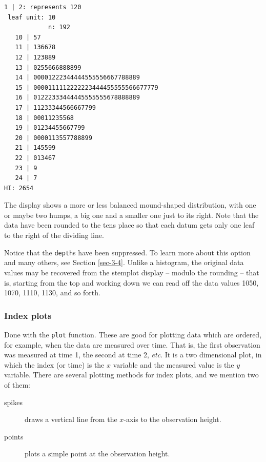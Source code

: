 \documentclass[captions=tableheading]{scrbook}
\begin{document}
\begin{verbatim}
1 | 2: represents 120
 leaf unit: 10
            n: 192
   10 | 57
   11 | 136678
   12 | 123889
   13 | 0255666888899
   14 | 00001222344444555556667788889
   15 | 0000111112222223444455555566677779
   16 | 01222333444445555555678888889
   17 | 11233344566667799
   18 | 00011235568
   19 | 01234455667799
   20 | 0000113557788899
   21 | 145599
   22 | 013467
   23 | 9
   24 | 7
HI: 2654
\end{verbatim}

The display shows a more or less balanced mound-shaped distribution, with one or maybe two humps, a big one and a smaller one just to its right. Note that the data have been rounded to the tens place so that each datum gets only one leaf to the right of the dividing line.

Notice that the \texttt{depth}s have been suppressed. To learn more about this option and many others, see Section \ref{sec-3-4}. Unlike a histogram, the original data values may be recovered from the stemplot display -- modulo the rounding -- that is, starting from the top and working down we can read off the data values 1050, 1070, 1110, 1130, and so forth. 
\subsubsection{Index plots}
\label{sec-3-1-2-4}


Done with the \texttt{plot} function. These are good for plotting data which are ordered, for example, when the data are measured over time. That is, the first observation was measured at time 1, the second at time 2, \emph{etc}. It is a two dimensional plot, in which the index (or time) is the \(x\) variable and the measured value is the \(y\) variable. There are several plotting methods for index plots, and we mention two of them:

\begin{description}
\item[spikes] draws a vertical line from the \(x\)-axis to the observation height.
\item[points] plots a simple point at the observation height.
\end{description}
\end{document}
